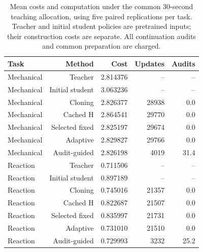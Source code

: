 \begin{table}[htbp]\centering\small\setlength{\tabcolsep}{4pt}
\begin{tabular}{@{}lrrrr@{}}\toprule
Task & Method & Cost & Updates & Audits\\\midrule
Mechanical & Teacher & 2.814376 & -- & --\\
Mechanical & Initial student & 3.063236 & -- & --\\
Mechanical & Cloning & 2.826377 & 28938 & 0.0\\
Mechanical & Cached H & 2.864541 & 29770 & 0.0\\
Mechanical & Selected fixed & 2.825197 & 29674 & 0.0\\
Mechanical & Adaptive & 2.829827 & 29766 & 0.0\\
Mechanical & Audit-guided & 2.826198 & 4019 & 31.4\\
Reaction & Teacher & 0.711506 & -- & --\\
Reaction & Initial student & 0.897189 & -- & --\\
Reaction & Cloning & 0.745016 & 21357 & 0.0\\
Reaction & Cached H & 0.822687 & 21507 & 0.0\\
Reaction & Selected fixed & 0.835997 & 21731 & 0.0\\
Reaction & Adaptive & 0.731010 & 21510 & 0.0\\
Reaction & Audit-guided & 0.729993 & 3232 & 25.2\\
\bottomrule\end{tabular}
\caption{Mean costs and computation under the common 30-second teaching
allocation, using five paired replications per task. Teacher and initial
student policies are pretrained inputs; their construction costs are separate.
All continuation audits and common preparation are charged.}
\label{tab:costs}
\end{table}
